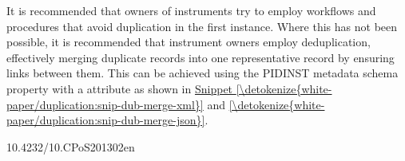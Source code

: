 \documentclass[a4paper,10pt,english]{sphinxmanual}
\begin{document}
It is recommended that owners of instruments try to employ workflows and
procedures that avoid duplication in the first instance. Where this has
not been possible, it is recommended that instrument owners employ
deduplication, effectively merging duplicate records into one
representative record by ensuring links between them. This can be
achieved using the PIDINST metadata schema  property
with a  attribute  as shown in
\hyperref[\detokenize{white-paper/duplication:snip-dub-merge-xml}]{Snippet \ref{\detokenize{white-paper/duplication:snip-dub-merge-xml}}} and \hyperref[\detokenize{white-paper/duplication:snip-dub-merge-json}]{\ref{\detokenize{white-paper/duplication:snip-dub-merge-json}}}.
\def\sphinxLiteralBlockLabel{\label{\detokenize{white-paper/duplication:id1}}\label{\detokenize{white-paper/duplication:snip-dub-merge-xml}}}
\begin{sphinxVerbatim}[commandchars=\\\{\}]
       10.4232/10.CPoS\PYGZhy{}2013\PYGZhy{}02en
\end{sphinxVerbatim}
\def\sphinxLiteralBlockLabel{\label{\detokenize{white-paper/duplication:id2}}\label{\detokenize{white-paper/duplication:snip-dub-merge-json}}}
\begin{sphinxVerbatim}[commandchars=\\\{\}]
\PYG{p}{[}
       
  \PYG{p}{]}
\end{sphinxVerbatim}
\end{document}
